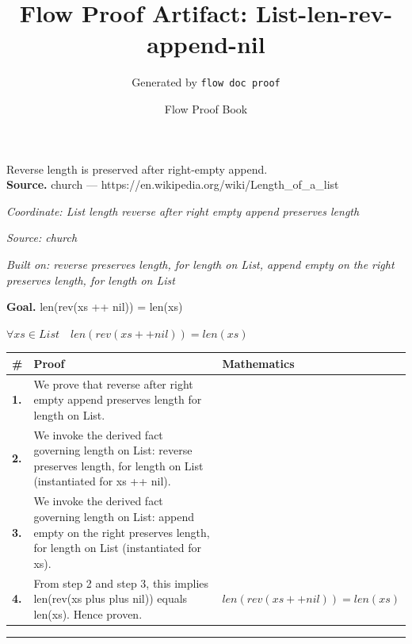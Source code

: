 \documentclass[11pt]{article}
\title{Flow Proof Artifact: List-len-rev-append-nil}
\author{Generated by \texttt{flow doc proof}}
\date{Flow Proof Book}
\theoremstyle{definition}
\begin{document}
\maketitle
Reverse length is preserved after right-empty append.\\[0.5em]
\textbf{Source.} church — https://en.wikipedia.org/wiki/Length\_of\_a\_list\\[0.5em]
\bigskip
{}\par
\smallskip\noindent\textit{Coordinate: List \cdot length \cdot reverse after right empty append preserves length}\par
\smallskip\noindent\textit{Source: church}\par
\smallskip\noindent\textit{Built on: reverse preserves length, for length on List, append empty on the right preserves length, for length on List}\par
\medskip
\noindent\textbf{Goal.} len(rev(xs ++ nil)) = len(xs)\par
\noindent$\displaystyle \forall xs \in List\quad len(rev(xs ++ nil)) = len(xs)$\par
\medskip
\noindent
\begin{tabular}{@{} >{\raggedright\arraybackslash}p{} >{\raggedright\arraybackslash}p{} >{\raggedleft\arraybackslash}p{} @{}}
\textbf{\#} & \textbf{Proof} & \textbf{Mathematics} \\
\midrule
\textbf{1.} & We prove that reverse after right empty append preserves length for length on List. & \\[0.45em]
\textbf{2.} & We invoke the derived fact governing length on List: reverse preserves length, for length on List (instantiated for xs ++ nil). & \\[0.45em]
\textbf{3.} & We invoke the derived fact governing length on List: append empty on the right preserves length, for length on List (instantiated for xs). & \\[0.45em]
\textbf{4.} & From step 2 and step 3, this implies len(rev(xs plus plus nil)) equals len(xs). Hence proven. & $\displaystyle len(rev(xs ++ nil)) = len(xs)$ \\[0.45em]
\bottomrule
\end{tabular}
\label{thm:List-length-reverse_after_right_empty_append_preserves_length}
\par\medskip\hrule
\end{document}
